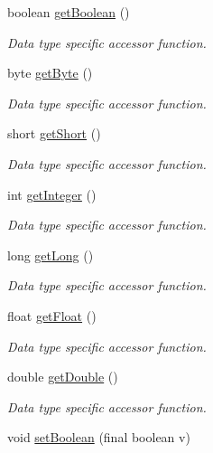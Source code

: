 \begin{DoxyCompactItemize}
boolean \hyperlink{classorg_1_1libelektra_1_1Key_a9841edcf6c48799c77d8db3b82189abc}{get\+Boolean} ()
\begin{DoxyCompactList}\small\item\em Data type specific accessor function. \end{DoxyCompactList}\item 
byte \hyperlink{classorg_1_1libelektra_1_1Key_ad29faef52eb7ceb2940d4960a5717b5c}{get\+Byte} ()
\begin{DoxyCompactList}\small\item\em Data type specific accessor function. \end{DoxyCompactList}\item 
short \hyperlink{classorg_1_1libelektra_1_1Key_a51754727fad0f4f9a540226ec329c74b}{get\+Short} ()
\begin{DoxyCompactList}\small\item\em Data type specific accessor function. \end{DoxyCompactList}\item 
int \hyperlink{classorg_1_1libelektra_1_1Key_a1dfefbb75e54fd1bff57d626954fb4fc}{get\+Integer} ()
\begin{DoxyCompactList}\small\item\em Data type specific accessor function. \end{DoxyCompactList}\item 
long \hyperlink{classorg_1_1libelektra_1_1Key_a545c7042ebb95d4b8ad45658ebb8ec85}{get\+Long} ()
\begin{DoxyCompactList}\small\item\em Data type specific accessor function. \end{DoxyCompactList}\item 
float \hyperlink{classorg_1_1libelektra_1_1Key_a24351f3c1faf4f7d69c7761aa60e69f1}{get\+Float} ()
\begin{DoxyCompactList}\small\item\em Data type specific accessor function. \end{DoxyCompactList}\item 
double \hyperlink{classorg_1_1libelektra_1_1Key_a64f1c2bc6776b8f08d8e50554713d07a}{get\+Double} ()
\begin{DoxyCompactList}\small\item\em Data type specific accessor function. \end{DoxyCompactList}\item 
void \hyperlink{classorg_1_1libelektra_1_1Key_a005125c24abc41a799d73d09c8c148f1}{set\+Boolean} (final boolean v)

\end{DoxyCompactItemize}

